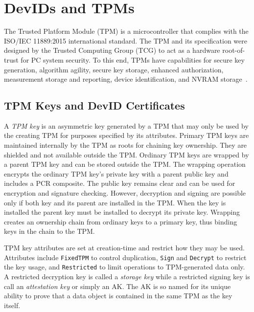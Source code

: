 \documentclass[runningheads]{llncs}
\begin{document}
\section{DevIDs and TPMs}
The Trusted Platform Module (TPM) is a microcontroller that complies
with the ISO/IEC 11889:2015 international standard.  The TPM and its
specification were designed by the Trusted Computing Group (TCG) to
act as a hardware root-of-trust for PC system security. To this end,
TPMs have capabilities for secure key generation, algorithm agility,
secure key storage, enhanced authorization, measurement storage and
reporting, device identification, and NVRAM
storage~\citep{PracticalGuide}.

\subsection{TPM Keys and DevID Certificates}

A \emph{TPM key} is an asymmetric key generated by a TPM that may only
be used by the creating TPM for purposes specified by its attributes.
Primary TPM keys are maintained internally by the TPM as roots for
chaining key ownership. They are shielded and not available outside
the TPM.  Ordinary TPM keys are wrapped by a parent TPM key and can be
stored outside the TPM.  The wrapping operation encrypts the ordinary
TPM key's private key with a parent public key and includes a PCR
composite. The public key remains clear and can be used for encryption
and signature checking.  However, decryption and signing are possible
only if both key and its parent are installed in the TPM.  When the
key is installed the parent key must be installed to decrypt its
private key.  Wrapping creates an ownership chain from ordinary keys
to a primary key, thus binding keys in the chain to the TPM.

TPM key attributes are set at creation-time and restrict how they may
be used.  Attributes include \verb|FixedTPM| to control duplication,
\verb|Sign| and \verb|Decrypt| to restrict the key usage, and
\verb|Restricted| to limit operations to TPM-generated data only.  A
restricted decryption key is called a \emph{storage key} while a
restricted signing key is call an \emph{attestation key} or simply an
AK.  The AK is so named for its unique ability to prove that a data
object is contained in the same TPM as the key itself.

\end{document}
